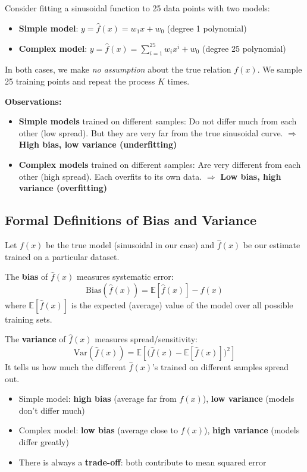 \documentclass[12pt,a4paper]{article}
\newcommand{\E}{\mathbb{E}}
\newcommand{\Var}{\mathrm{Var}}
\newcommand{\Bias}{\mathrm{Bias}}
\begin{document}
Consider fitting a sinusoidal function to 25 data points with two models:
\begin{itemize}
  \item \textbf{Simple model}: $y = \hat{f}(x) = w_1 x + w_0$ (degree 1 polynomial)
  \item \textbf{Complex model}: $y = \hat{f}(x) = \sum_{i=1}^{25}w_i x^i + w_0$ (degree 25 polynomial)
\end{itemize}

In both cases, we make \emph{no assumption} about the true relation $f(x)$. We sample 25 training points and repeat the process $K$ times.

\textbf{Observations:}
\begin{itemize}
  \item \textbf{Simple models} trained on different samples: Do not differ much from each other (low spread). But they are very far from the true sinusoidal curve. $\Rightarrow$ \textbf{High bias, low variance (underfitting)}
  \item \textbf{Complex models} trained on different samples: Are very different from each other (high spread). Each overfits to its own data. $\Rightarrow$ \textbf{Low bias, high variance (overfitting)}
\end{itemize}

\subsection{Formal Definitions of Bias and Variance}

Let $f(x)$ be the true model (sinusoidal in our case) and $\hat{f}(x)$ be our estimate trained on a particular dataset.

\begin{defbox}
The \textbf{bias} of $\hat{f}(x)$ measures systematic error:
\[
\Bias(\hat{f}(x)) = \E[\hat{f}(x)] - f(x)
\]
where $\E[\hat{f}(x)]$ is the expected (average) value of the model over all possible training sets.

The \textbf{variance} of $\hat{f}(x)$ measures spread/sensitivity:
\[
\Var(\hat{f}(x)) = \E\!\left[\bigl(\hat{f}(x) - \E[\hat{f}(x)]\bigr)^2\right]
\]
It tells us how much the different $\hat{f}(x)$'s trained on different samples spread out.
\end{defbox}

\begin{itemize}
  \item Simple model: \textbf{high bias} (average far from $f(x)$), \textbf{low variance} (models don't differ much)
  \item Complex model: \textbf{low bias} (average close to $f(x)$), \textbf{high variance} (models differ greatly)
  \item There is always a \textbf{trade-off}: both contribute to mean squared error
\end{itemize}
\end{document}
